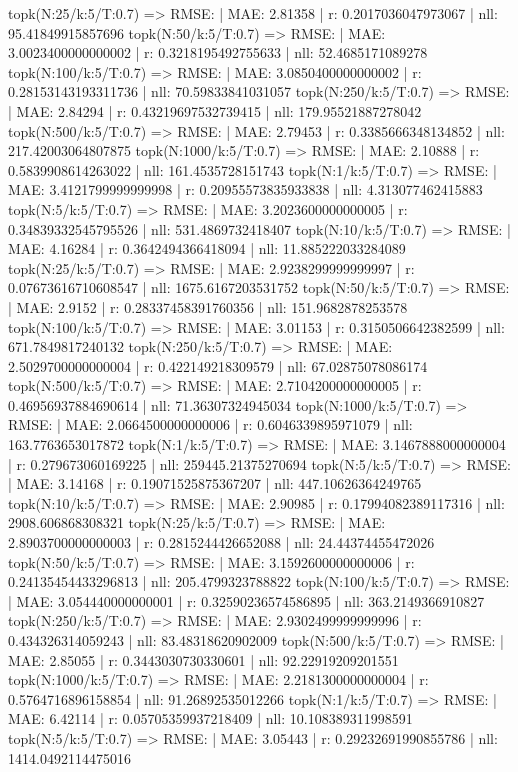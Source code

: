 topk(N:25/k:5/T:0.7) => RMSE: | MAE: 2.81358 | r: 0.2017036047973067 | nll: 95.41849915857696
topk(N:50/k:5/T:0.7) => RMSE: | MAE: 3.0023400000000002 | r: 0.3218195492755633 | nll: 52.4685171089278
topk(N:100/k:5/T:0.7) => RMSE: | MAE: 3.0850400000000002 | r: 0.28153143193311736 | nll: 70.59833841031057
topk(N:250/k:5/T:0.7) => RMSE: | MAE: 2.84294 | r: 0.43219697532739415 | nll: 179.95521887278042
topk(N:500/k:5/T:0.7) => RMSE: | MAE: 2.79453 | r: 0.3385666348134852 | nll: 217.42003064807875
topk(N:1000/k:5/T:0.7) => RMSE: | MAE: 2.10888 | r: 0.5839908614263022 | nll: 161.4535728151743
topk(N:1/k:5/T:0.7) => RMSE: | MAE: 3.4121799999999998 | r: 0.20955573835933838 | nll: 4.313077462415883
topk(N:5/k:5/T:0.7) => RMSE: | MAE: 3.2023600000000005 | r: 0.34839332545795526 | nll: 531.4869732418407
topk(N:10/k:5/T:0.7) => RMSE: | MAE: 4.16284 | r: 0.3642494366418094 | nll: 11.885222033284089
topk(N:25/k:5/T:0.7) => RMSE: | MAE: 2.9238299999999997 | r: 0.07673616710608547 | nll: 1675.6167203531752
topk(N:50/k:5/T:0.7) => RMSE: | MAE: 2.9152 | r: 0.28337458391760356 | nll: 151.9682878253578
topk(N:100/k:5/T:0.7) => RMSE: | MAE: 3.01153 | r: 0.3150506642382599 | nll: 671.7849817240132
topk(N:250/k:5/T:0.7) => RMSE: | MAE: 2.5029700000000004 | r: 0.422149218309579 | nll: 67.02875078086174
topk(N:500/k:5/T:0.7) => RMSE: | MAE: 2.7104200000000005 | r: 0.46956937884690614 | nll: 71.36307324945034
topk(N:1000/k:5/T:0.7) => RMSE: | MAE: 2.0664500000000006 | r: 0.6046339895971079 | nll: 163.7763653017872
topk(N:1/k:5/T:0.7) => RMSE: | MAE: 3.1467888000000004 | r: 0.279673060169225 | nll: 259445.21375270694
topk(N:5/k:5/T:0.7) => RMSE: | MAE: 3.14168 | r: 0.19071525875367207 | nll: 447.10626364249765
topk(N:10/k:5/T:0.7) => RMSE: | MAE: 2.90985 | r: 0.17994082389117316 | nll: 2908.606868308321
topk(N:25/k:5/T:0.7) => RMSE: | MAE: 2.8903700000000003 | r: 0.2815244426652088 | nll: 24.44374455472026
topk(N:50/k:5/T:0.7) => RMSE: | MAE: 3.1592600000000006 | r: 0.24135454433296813 | nll: 205.4799323788822
topk(N:100/k:5/T:0.7) => RMSE: | MAE: 3.054440000000001 | r: 0.32590236574586895 | nll: 363.2149366910827
topk(N:250/k:5/T:0.7) => RMSE: | MAE: 2.9302499999999996 | r: 0.434326314059243 | nll: 83.48318620902009
topk(N:500/k:5/T:0.7) => RMSE: | MAE: 2.85055 | r: 0.3443030730330601 | nll: 92.22919209201551
topk(N:1000/k:5/T:0.7) => RMSE: | MAE: 2.2181300000000004 | r: 0.5764716896158854 | nll: 91.26892535012266
topk(N:1/k:5/T:0.7) => RMSE: | MAE: 6.42114 | r: 0.05705359937218409 | nll: 10.108389311998591
topk(N:5/k:5/T:0.7) => RMSE: | MAE: 3.05443 | r: 0.29232691990855786 | nll: 1414.0492114475016
